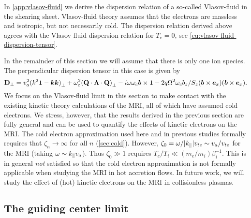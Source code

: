 \documentclass[aps,pre,notitlepage,amsmath,amssymb,amsfonts,nobibnotes,nofootinbib,superscriptaddress]{revtex4-1}
\begin{document}
In \cref{app:vlasov-fluid} we derive the dispersion relation of a so-called
Vlasov-fluid in the shearing sheet. Vlasov-fluid theory \citep{Freidberg1972}
assumes that the electrons are massless and isotropic, but not necessarily
cold. The dispersion relation derived above agrees with the Vlasov-fluid
dispersion relation for $T_e=0$, see \cref{eq:vlasov-fluid-dispersion-tensor}.

In the remainder of this section we will assume that there is only one ion
species. The perpendicular dispersion tensor in this case is given by
\begin{equation}
  \label{eq:perpendicular-dispersion-single}
  \mathbf{D}_\perp =
  \va^2{(k^2\mathbf{1} - \vec{k}\vec{k})}_\perp
  + \omc^2{(\mathbf{Q}\cdot\mathbf{\Lambda}\cdot\mathbf{Q})}_\perp
  - i\omega\omc\vec{b}\times\mathbf{1}
  - 2q\Omega^2\omc b_z/S_z
  (\vec{b}\times\ex)(\vec{b}\times\ex).
\end{equation}
We focus on the Vlasov-fluid limit in this section to make contact with the
existing kinetic theory calculations of the MRI, all of which have assumed
cold electrons. We stress, however, that the results derived in the previous
section are fully general and can be used to quantify the effects of kinetic
electrons on the MRI\@. The cold electron approximation used here and in
previous studies formally requires that $\zeta_n\rightarrow\infty$ for all $n$
(\cref{sec:cold}). However,
$\zeta_0=\omega/|k_\parallel|v_{te}\sim{}v_a/v_{te}$ for the MRI (taking
$\omega\sim{}k_\parallel v_a$). Thus $\zeta_0\gg{}1$ requires
$T_e/T_i\ll(m_e/m_i)\beta_i^{-1}$. This is in general \emph{not} satisfied so
that the cold electron approximation is not formally applicable when studying
the MRI in hot accretion flows. In future work, we will study the effect of
(hot) kinetic electrons on the MRI in collisionless plasmas.

\subsection{The guiding center limit}
\label{sec:guiding-center}
\end{document}
